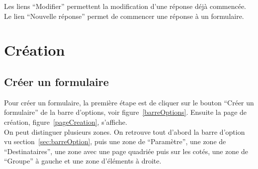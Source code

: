 \documentclass[a4paper,11pt,final]{report}
\begin{document}
Les liens ``Modifier'' permettent la modification d'une réponse déjà commencée. Le lien ``Nouvelle réponse'' permet de commencer une réponse à un formulaire.

\noindent\begin{minipage}{\linewidth}%
\label{zoneFormRecu}
\end{minipage}

\chapter{Création}
\section{Créer un formulaire}
Pour créer un formulaire, la première étape est de cliquer sur le bouton ``Créer un formulaire'' de la barre d'options, voir figure~\ref{barreOptions}. Ensuite la page de création, figure~\ref{pageCreation}, s'affiche.\\
On peut distinguer plusieurs zones. On retrouve tout d'abord la barre d'option vu section~\ref{sec:barreOption}, puis une zone de ``Paramètre'', une zone de ``Destinataires'', une zone avec une page quadriée puis sur les cotés, une zone de ``Groupe'' à gauche et une zone d'éléments à droite.

\noindent\begin{minipage}{\linewidth}%
\label{pageCreation}
\end{minipage}
\end{document}

